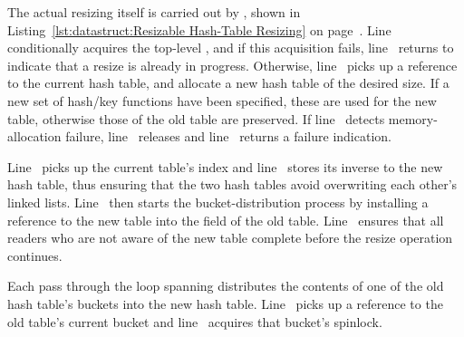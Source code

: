 \begin{fcvref}
The actual resizing itself is carried out by , shown in
Listing~\ref{lst:datastruct:Resizable Hash-Table Resizing} on
page~\pageref{lst:datastruct:Resizable Hash-Table Resizing}.
Line~ conditionally acquires the top-level , and if
this acquisition fails, line~ returns  to indicate that
a resize is already in progress.
Otherwise, line~ picks up a reference to the current hash table,
and  allocate a new hash table of the desired size.
If a new set of hash/key functions have been specified, these are
used for the new table, otherwise those of the old table are preserved.
If line~ detects memory-allocation failure,
line~ releases 
and line~ returns a failure indication.

Line~ picks up the current table's index and
line~ stores its inverse to
the new hash table, thus ensuring that the two hash tables avoid overwriting
each other's linked lists.
Line~ then starts the bucket-distribution process by
installing a reference to the new table into the  field of
the old table.
Line~ ensures that all readers who are not aware of the
new table complete before the resize operation continues.

Each pass through the loop spanning  distributes the contents
of one of the old hash table's buckets into the new hash table.
Line~ picks up a reference to the old table's current bucket
and line~ acquires that bucket's spinlock.
\end{fcvref}

